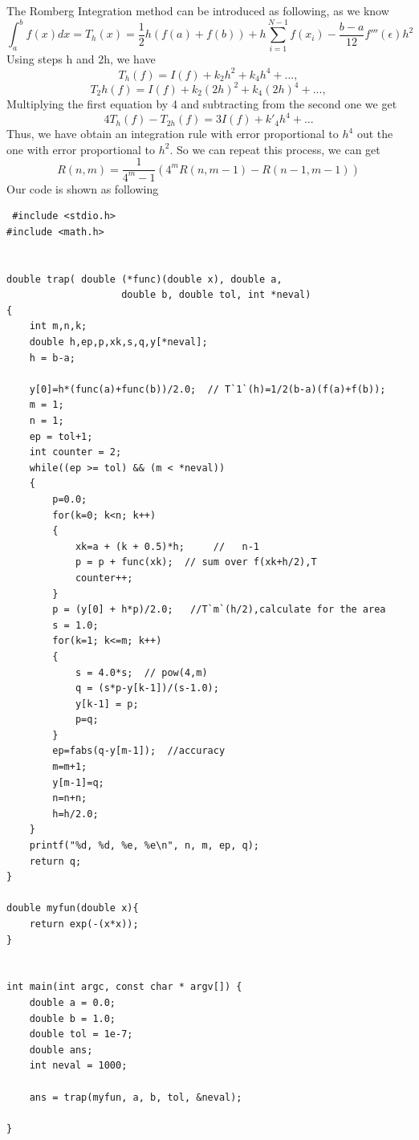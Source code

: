 \documentclass{article}
\begin{document}
The Romberg Integration method can be introduced as following, 
as we know
\begin{equation}
\int_{a}^{b} f(x)dx = T_h(x) = \frac{1}{2}h(f(a) + f(b)) + h\sum_{i = 1}^{N - 1}f(x_i) - \frac{b - a}{12}f'''(\epsilon)h^2
\end{equation}
Using steps h and 2h, we have
\begin{equation}
T_h(f) = I(f) + k_2h^2 + k_4h^4 + ... ,
\end{equation}
\begin{equation}
T_2h(f) = I(f) + k_2(2h)^2 + k_4(2h)^4 + ... ,
\end{equation}
Multiplying the first equation by 4 and subtracting from the second one we get
\begin{equation}
4T_h(f) - T_{2h}(f) = 3I(f) + k'_4h^4 + ...
\end{equation}
Thus, we have obtain an integration rule with error proportional to $h^4$ out the one with error proportional to $h^2$. So we can repeat this process, we can get
\begin{equation}
R(n, m) = \frac{1}{4^m - 1}(4^m R(n, m - 1) - R(n - 1, m - 1))
\end{equation}
 Our code is shown as following
 \begin{lstlisting}
 #include <stdio.h>
#include <math.h>


double trap( double (*func)(double x), double a,
                    double b, double tol, int *neval)
{
    int m,n,k;
    double h,ep,p,xk,s,q,y[*neval];
    h = b-a;

    y[0]=h*(func(a)+func(b))/2.0;  // T`1`(h)=1/2(b-a)(f(a)+f(b));
    m = 1;
    n = 1;
    ep = tol+1;
    int counter = 2;
    while((ep >= tol) && (m < *neval))
    {
        p=0.0;
        for(k=0; k<n; k++)
        {
            xk=a + (k + 0.5)*h;     //   n-1
            p = p + func(xk);  // sum over f(xk+h/2),T
            counter++;
        }                      
        p = (y[0] + h*p)/2.0;   //T`m`(h/2),calculate for the area
        s = 1.0;
        for(k=1; k<=m; k++)
        {
            s = 4.0*s;  // pow(4,m)
            q = (s*p-y[k-1])/(s-1.0); 
            y[k-1] = p;
            p=q;
        }
        ep=fabs(q-y[m-1]);  //accuracy
        m=m+1;
        y[m-1]=q;
        n=n+n;   
        h=h/2.0;
    }
    printf("%d, %d, %e, %e\n", n, m, ep, q);
    return q;
}
    
double myfun(double x){
    return exp(-(x*x));
}


int main(int argc, const char * argv[]) {
    double a = 0.0;
    double b = 1.0;
    double tol = 1e-7;
    double ans;
    int neval = 1000;
    
    ans = trap(myfun, a, b, tol, &neval);
    
}
 \end{lstlisting}
\end{document}
